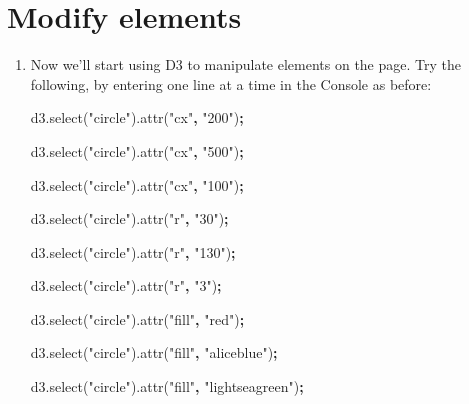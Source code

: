 \documentclass[openany]{book}
\newenvironment{Shaded}{\begin{snugshade}}{\end{snugshade}}
\newcommand{\AttributeTok}[1]{\textcolor[rgb]{0.77,0.63,0.00}{#1}}
\newcommand{\NormalTok}[1]{#1}
\newcommand{\OperatorTok}[1]{\textcolor[rgb]{0.81,0.36,0.00}{\textbf{#1}}}
\newcommand{\StringTok}[1]{\textcolor[rgb]{0.31,0.60,0.02}{#1}}
\newcommand{\VariableTok}[1]{\textcolor[rgb]{0.00,0.00,0.00}{#1}}
\begin{document}
\hypertarget{modify-elements}{%
\section{Modify elements }\label{modify-elements}}

\begin{enumerate}
\def\labelenumi{\arabic{enumi}.}
\item
  Now we'll start using D3 to manipulate elements on the page. Try the following, by entering one line at a time in the Console as before:

\begin{Shaded}
\begin{Highlighting}[]
\VariableTok{d3}\NormalTok{.}\AttributeTok{select}\NormalTok{(}\StringTok{"circle"}\NormalTok{).}\AttributeTok{attr}\NormalTok{(}\StringTok{"cx"}\OperatorTok{,} \StringTok{"200"}\NormalTok{)}\OperatorTok{;}

\VariableTok{d3}\NormalTok{.}\AttributeTok{select}\NormalTok{(}\StringTok{"circle"}\NormalTok{).}\AttributeTok{attr}\NormalTok{(}\StringTok{"cx"}\OperatorTok{,} \StringTok{"500"}\NormalTok{)}\OperatorTok{;}

\VariableTok{d3}\NormalTok{.}\AttributeTok{select}\NormalTok{(}\StringTok{"circle"}\NormalTok{).}\AttributeTok{attr}\NormalTok{(}\StringTok{"cx"}\OperatorTok{,} \StringTok{"100"}\NormalTok{)}\OperatorTok{;}

\VariableTok{d3}\NormalTok{.}\AttributeTok{select}\NormalTok{(}\StringTok{"circle"}\NormalTok{).}\AttributeTok{attr}\NormalTok{(}\StringTok{"r"}\OperatorTok{,} \StringTok{"30"}\NormalTok{)}\OperatorTok{;}

\VariableTok{d3}\NormalTok{.}\AttributeTok{select}\NormalTok{(}\StringTok{"circle"}\NormalTok{).}\AttributeTok{attr}\NormalTok{(}\StringTok{"r"}\OperatorTok{,} \StringTok{"130"}\NormalTok{)}\OperatorTok{;}

\VariableTok{d3}\NormalTok{.}\AttributeTok{select}\NormalTok{(}\StringTok{"circle"}\NormalTok{).}\AttributeTok{attr}\NormalTok{(}\StringTok{"r"}\OperatorTok{,} \StringTok{"3"}\NormalTok{)}\OperatorTok{;}

\VariableTok{d3}\NormalTok{.}\AttributeTok{select}\NormalTok{(}\StringTok{"circle"}\NormalTok{).}\AttributeTok{attr}\NormalTok{(}\StringTok{"fill"}\OperatorTok{,} \StringTok{"red"}\NormalTok{)}\OperatorTok{;}

\VariableTok{d3}\NormalTok{.}\AttributeTok{select}\NormalTok{(}\StringTok{"circle"}\NormalTok{).}\AttributeTok{attr}\NormalTok{(}\StringTok{"fill"}\OperatorTok{,} \StringTok{"aliceblue"}\NormalTok{)}\OperatorTok{;}

\VariableTok{d3}\NormalTok{.}\AttributeTok{select}\NormalTok{(}\StringTok{"circle"}\NormalTok{).}\AttributeTok{attr}\NormalTok{(}\StringTok{"fill"}\OperatorTok{,} \StringTok{"lightseagreen"}\NormalTok{)}\OperatorTok{;}
\end{Highlighting}
\end{Shaded}
\end{enumerate}
\end{document}
